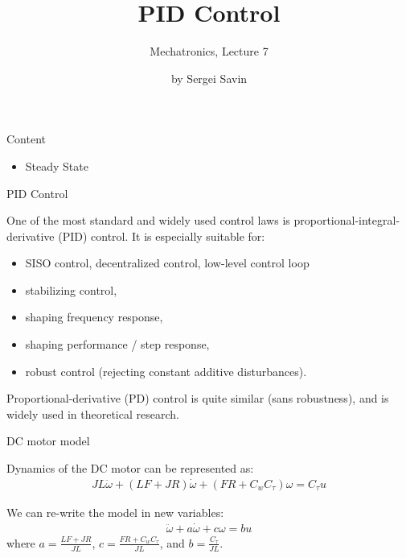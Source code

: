 \documentclass{beamer}
\title{PID Control}
\subtitle{Mechatronics, Lecture 7}
\author{by Sergei Savin}
\date{\mydate}
\begin{document}
\maketitle



\begin{frame}{Content}
\begin{itemize}
\item Steady State
\end{itemize}
\end{frame}




\begin{frame}{PID Control}
	\begin{flushleft}
		
		One of the most standard and widely used control laws is proportional-integral-derivative (PID) control. It is especially suitable for:
		
		\begin{itemize}
			\item SISO control, decentralized control, low-level control loop
			\item stabilizing control,
			\item shaping frequency response,
			\item shaping performance / step response,
			\item robust control (rejecting constant additive disturbances).
		\end{itemize}
		
		Proportional-derivative (PD) control is quite similar (sans robustness), and is widely used in theoretical research.
		
	\end{flushleft}
\end{frame}



\begin{frame}{DC motor model}
	\begin{flushleft}
		
		Dynamics of the DC motor can be represented as:
		\begin{align}
			JL \ddot \omega  + (LF+JR) \dot \omega   +( FR+C_w C_\tau)\omega =
			C_\tau u 
		\end{align}
		
		We can re-write the model in new variables:
		\begin{align}
			\ddot \omega  + a\dot \omega  + c\omega =
			b u 
		\end{align}
		where $a = \frac{LF+JR}{JL}$, $c = \frac{FR+C_w C_\tau}{JL}$, and $b = \frac{C_\tau}{JL}$.
		
	\end{flushleft}
\end{frame}
\end{document}
